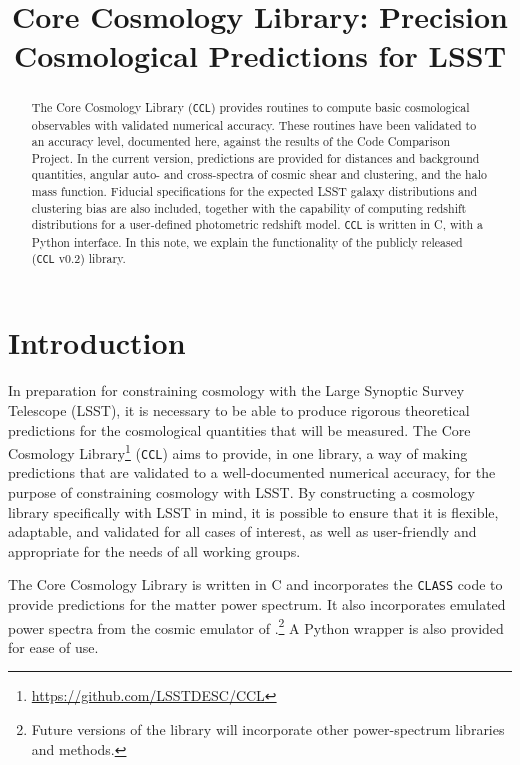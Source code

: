 \documentclass[\docopts]{\docclass}
\newcommand{\ccl}{{\tt CCL}\xspace}
\begin{document}
\title{Core Cosmology Library: Precision Cosmological Predictions for LSST}

\maketitlepre

\begin{abstract}

The Core Cosmology Library (\ccl) provides routines to compute basic cosmological observables with validated numerical accuracy. These routines have been validated to an accuracy level, documented here, against the results of the Code Comparison Project. In the current version, predictions are provided for distances and background quantities, angular auto- and cross-spectra of cosmic shear and clustering, and the halo mass function. Fiducial specifications for the expected LSST galaxy distributions and clustering bias are also included, together with the capability of computing redshift distributions for a user-defined photometric redshift model. \ccl is written in C, with a Python interface. In this note, we explain the functionality of the publicly released (\ccl v0.2) library.

\end{abstract}


\maketitlepost

\newpage
\tableofcontents{}
\newpage

\section{Introduction}
\label{sec:intro}

In preparation for constraining cosmology with the Large Synoptic Survey Telescope (LSST), it is necessary to be able to produce rigorous theoretical predictions for the cosmological quantities that will be measured. The Core Cosmology Library\footnote{\url{https://github.com/LSSTDESC/CCL}} (\ccl) aims to provide, in one library, a way of making predictions that are validated to a well-documented numerical accuracy, for the purpose of constraining cosmology with LSST. By constructing a cosmology library specifically with LSST in mind, it is possible to ensure that it is flexible, adaptable, and validated for all cases of interest, as well as user-friendly and appropriate for the needs of all working groups.

The Core Cosmology Library is written in C and incorporates the {\tt CLASS} code \citep{class} to provide predictions for the matter power spectrum. It also incorporates emulated power spectra from the cosmic emulator of \citet{Lawrence17}.\footnote{Future versions of the library will incorporate other power-spectrum libraries and methods.} A Python wrapper is also provided for ease of use.
\end{document}
